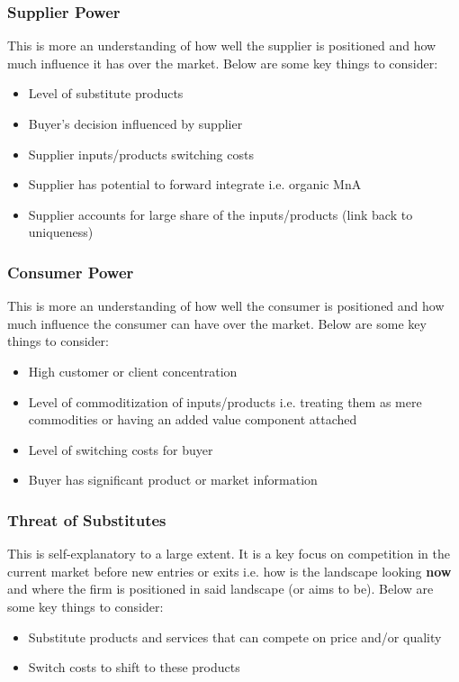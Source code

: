 \documentclass[a4paper]{article}
\begin{document}
{\subsubsection{Supplier Power}
This is more an understanding of how well the supplier is positioned and how much influence it has over the market. Below are some key things to consider:

\begin{itemize}
	\item Level of substitute products
	\item Buyer's decision influenced by supplier
	\item Supplier inputs/products switching costs
	\item Supplier has potential to forward integrate i.e. organic MnA
	\item Supplier accounts for large share of the inputs/products (link back to uniqueness)
\end{itemize}

\subsubsection{Consumer Power}
This is more an understanding of how well the consumer is positioned and how much influence the consumer can have over the market. Below are some key things to consider:

\begin{itemize}
	\item High customer or client concentration
	\item Level of commoditization of inputs/products i.e. treating them as mere commodities or having an added value component attached
	\item Level of switching costs for buyer
	\item Buyer has significant product or market information
\end{itemize}

\subsubsection{Threat of Substitutes}
This is self-explanatory to a large extent. It is a key focus on competition in the current market before new entries or exits i.e. how is the landscape looking \textbf{now} and where the firm is positioned in said landscape (or aims to be). Below are some key things to consider:

\begin{itemize}
	\item Substitute products and services that can compete on price and/or quality
	\item Switch costs to shift to these products
\end{itemize}

}
\end{document}
